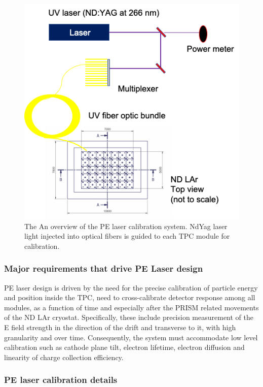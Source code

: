 \begin{figure}[htbp]
\centering 
\includegraphics[width=0.47\linewidth]{graphics/lartpc/Calibration/PElaserOverview.png}
\caption{\label{fig:PElaser_overview} The An overview of the PE laser calibration system. NdYag laser light injected into optical fibers is guided to each TPC module for calibration.}
\end{figure}

\subsubsection{Major requirements that drive PE Laser design}
        
PE laser design is driven by the need for the precise calibration of particle energy and position inside the TPC, need to cross-calibrate detector response among all modules, as a function of time and especially after the PRISM related movements of the ND LAr cryostat. Specifically, these include precision measurement of the E field strength in the direction of the drift and transverse to it, with high granularity and over time.  Consequently, the system must accommodate low level calibration such as cathode plane tilt, electron lifetime, electron diffusion and linearity of charge collection efficiency.

\subsubsection{PE laser calibration  details}
   
